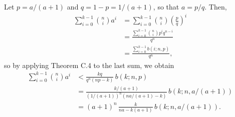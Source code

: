 Let $p=a/(a+1)$ and $q=1-p=1/(a+1)$, so that $a=p/q$.
Then,
\begin{align*}
    \sum_{i=0}^{k-1}\binom{n}{i}a^i &= \sum_{i=0}^{k-1}\binom{n}{i}\left(\frac{p}{q}\right)^i \\[1mm]
    &= \frac{\sum_{i=0}^{k-1}\binom{n}{i}p^iq^{n-i}}{q^n} \\[1mm]
    &= \frac{\sum_{i=0}^{k-1}b(i;n,p)}{q^n},
\end{align*}
so by applying Theorem C.4 to the last sum, we obtain
\begin{align*}
    \sum_{i=0}^{k-1}\binom{n}{i}a^i &< \frac{kq}{q^n(np-k)}\,b(k;n,p) \\
    &= \frac{k/(a+1)}{(1/(a+1))^n(na/(a+1)-k)}\,b(k;n,a/(a+1)) \\[1mm]
    &= (a+1)^n\,\frac{k}{na-k(a+1)}\,b(k;n,a/(a+1)).
\end{align*}
